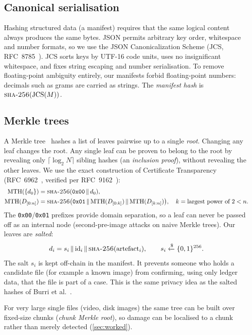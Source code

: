 \subsection{Canonical serialisation}
Hashing structured data (a manifest) requires that the same logical content always produces the same bytes. JSON permits arbitrary key order, whitespace and number formats, so we use the JSON Canonicalization Scheme (JCS, RFC~8785~\cite{rfc8785}). JCS sorts keys by UTF-16 code units, uses no insignificant whitespace, and fixes string escaping and number serialisation. To remove floating-point ambiguity entirely, our manifests forbid floating-point numbers: decimals such as  grams are carried as strings. The \emph{manifest hash} is $\textsc{sha-256}(\mathrm{JCS}(M))$.

\subsection{Merkle trees}
A Merkle tree~\cite{merkle1987} hashes a list of leaves pairwise up to a single \emph{root}. Changing any leaf changes the root. Any single leaf can be proven to belong to the root by revealing only $\lceil \log_2 N \rceil$ sibling hashes (an \emph{inclusion proof}), without revealing the other leaves. We use the exact construction of Certificate Transparency (RFC~6962~\cite{rfc6962}, verified per RFC~9162~\cite{rfc9162}):
\begin{align*}
\mathrm{MTH}(\{d_0\}) &= \textsc{sha-256}(\texttt{0x00} \,\|\, d_0), \\
\mathrm{MTH}(D_{[0:n]}) &= \textsc{sha-256}\big(\texttt{0x01} \,\|\, \mathrm{MTH}(D_{[0:k]}) \,\|\, \mathrm{MTH}(D_{[k:n]})\big), \quad k = \text{largest power of 2} < n.
\end{align*}
The \texttt{0x00}/\texttt{0x01} prefixes provide domain separation, so a leaf can never be passed off as an internal node (second-pre-image attacks on naive Merkle trees). Our leaves are \emph{salted}:
\[
d_i = s_i \,\|\, \mathrm{id}_i \,\|\, \textsc{sha-256}(\text{artefact}_i), \qquad s_i \xleftarrow{\$} \{0,1\}^{256}.
\]
The salt $s_i$ is kept off-chain in the manifest. It prevents someone who holds a candidate file (for example a known image) from confirming, using only ledger data, that the file is part of a case. This is the same privacy idea as the salted hashes of Burri et al.~\cite{burri2020}.

For very large single files (video, disk images) the same tree can be built over fixed-size chunks (\emph{chunk Merkle root}), so damage can be localised to a chunk rather than merely detected (\cref{sec:worked}).

